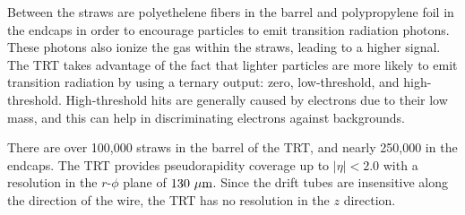 Between the straws are polyethelene fibers in the barrel and polypropylene foil in the endcaps in order to encourage particles to emit transition radiation photons.
These photons also ionize the gas within the straws, leading to a higher signal.
The TRT takes advantage of the fact that lighter particles are more likely to emit transition radiation by using a ternary output: zero, low-threshold, and high-threshold.
High-threshold hits are generally caused by electrons due to their low mass, and this can help in discriminating electrons against backgrounds. 

There are over 100,000 straws in the barrel of the TRT, and nearly 250,000 in the endcaps.
The TRT provides pseudorapidity coverage up to $|\eta| < 2.0$ with a resolution in the $r$-$\phi$ plane of $130~\mu\textrm{m}$.
Since the drift tubes are insensitive along the direction of the wire, the TRT has no resolution in the $z$ direction.
